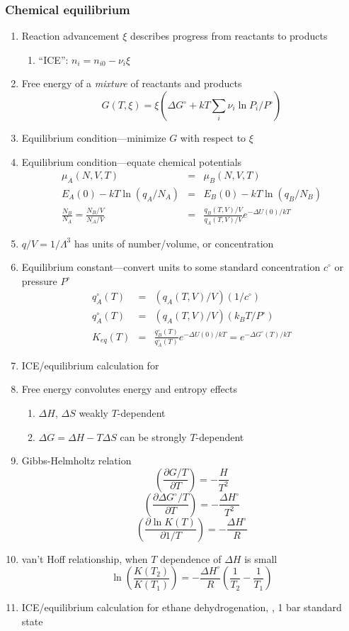 \documentclass[11pt]{article}
\begin{document}
\subsubsection{Chemical equilibrium}
\label{sec:orgf21424a}
\begin{enumerate}
\item Reaction advancement \(\xi\) describes progress from reactants to products
\begin{enumerate}
\item ``ICE'': \(n_i = n_{i0} -\nu_i \xi\)
\end{enumerate}
\item Free energy of a \emph{mixture} of reactants and products
\[G(T,\xi) = \xi  (\Delta G^\circ + k T \sum_i \nu_i \ln P_i/P^\circ) \]
\item Equilibrium condition---minimize \(G\) with respect to \(\xi\)
\item Equilibrium condition---equate chemical potentials
  \begin{eqnarray*}
 \mu_A(N,V,T) & = & \mu_B(N,V,T) \\
 E_A(0) - k T \ln (q_A/N_A) & = & E_B(0) - k T \ln (q_B/N_B) \\
\frac{N_B}{N_A} =  \frac{N_B/V}{N_A/V} & = &\frac{q_B(T,V)/V}{q_A(T,V)/V} e^{-\Delta U(0)/kT}
  \end{eqnarray*}
\item \(q/V = 1/\Lambda^3\) has units of number/volume, or concentration
\item Equilibrium constant---convert units to some standard concentration \(c^\circ\) or pressure \(P^\circ\)
 \begin{eqnarray*}
  q_A^\circ(T) & = & (q_A(T,V)/V) (1/c^\circ) \\
  q_A^\circ(T) & = & (q_A(T,V)/V)(k_B T/P^\circ) \\ 
K_{eq}(T) & = &\frac{q_B^\circ(T)}{q_A^\circ(T)} e^{-\Delta U(0)/kT} = e^{-\Delta G^\circ(T)/kT} 
 \end{eqnarray*}
\item ICE/equilibrium calculation for 
\item Free energy convolutes energy and entropy effects
\begin{enumerate}
\item \(\Delta H\), \(\Delta S\) weakly \(T\)-dependent
\item \(\Delta G = \Delta H - T\Delta S\) can be strongly \(T\)-dependent
\end{enumerate}
\item Gibbs-Helmholtz relation
\[ \left ( \frac{\partial G/T}{\partial T}\right )= -\frac{H}{T^2}\]
\[ \left ( \frac{\partial \Delta G^\circ/T}{\partial T}\right )= -\frac{\Delta H^\circ}{T^2}\]
\[ \left ( \frac{\partial \ln K(T)}{\partial 1/T}\right )= -\frac{\Delta H^\circ}{R}\]
\item van't Hoff relationship, when \(T\) dependence of \(\Delta H\) is small
\[  \ln\left ( \frac{K(T_2)}{K(T_1)}\right )= -\frac{\Delta H^\circ}{R}\left ( \frac{1}{T_2}-\frac{1}{T_1}\right ) \]
\item ICE/equilibrium calculation for ethane dehydrogenation, , 1 bar standard state
\end{enumerate}
\end{document}
